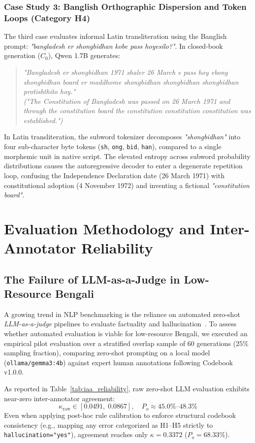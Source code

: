 \documentclass[11pt,a4paper,twocolumn]{article}
\begin{document}
\subsubsection{Case Study 3: Banglish Orthographic Dispersion and Token Loops (Category H4)}
The third case evaluates informal Latin transliteration using the Banglish prompt: \emph{"bangladesh er shongbidhan kobe pass hoyesilo?"}. In closed-book generation ($C_0$), Qwen 1.7B generates:
\begin{quote}
    \emph{"Bangladesh er shongbidhan 1971 shaler 26 March e pass hoy ebong shongbidhan board er maddhome shongbidhan shongbidhan shongbidhan protishthito hoy."} \\
    \emph{("The Constitution of Bangladesh was passed on 26 March 1971 and through the constitution board the constitution constitution constitution was established.")}
\end{quote}
In Latin transliteration, the subword tokenizer decomposes \emph{"shongbidhan"} into four sub-character byte tokens (\texttt{sh}, \texttt{ong}, \texttt{bid}, \texttt{han}), compared to a single morphemic unit in native script. The elevated entropy across subword probability distributions causes the autoregressive decoder to enter a degenerate repetition loop, confusing the Independence Declaration date (26 March 1971) with constitutional adoption (4 November 1972) and inventing a fictional \emph{"constitution board"}.

\section{Evaluation Methodology and Inter-Annotator Reliability}
\label{sec:evaluation_reliability}

\subsection{The Failure of LLM-as-a-Judge in Low-Resource Bengali}
A growing trend in NLP benchmarking is the reliance on automated zero-shot \emph{LLM-as-a-judge} pipelines to evaluate factuality and hallucination~\citep{li2023halueval}. To assess whether automated evaluation is viable for low-resource Bengali, we executed an empirical pilot evaluation over a stratified overlap sample of 60 generations ($25\%$ sampling fraction), comparing zero-shot prompting on a local model (\texttt{ollama/gemma3:4b}) against expert human annotations following Codebook v1.0.0.

As reported in Table~\ref{tab:iaa_reliability}, raw zero-shot LLM evaluation exhibits near-zero inter-annotator agreement:
\begin{equation}
    \kappa_{\text{raw}} \in [0.0491, \; 0.0867], \quad P_o \approx 45.0\% \text{--} 48.3\%
\end{equation}
Even when applying post-hoc rule calibration to enforce structural codebook consistency (e.g., mapping any error categorized as H1--H5 strictly to \texttt{hallucination="yes"}), agreement reaches only $\kappa = 0.3372$ ($P_o = 68.33\%$).
\end{document}
